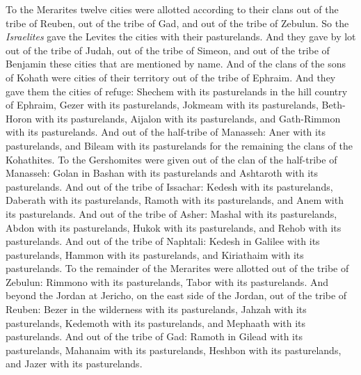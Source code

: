 \begin{biblechapter}
\verse To the Merarites twelve cities were allotted according to their clans out of the tribe of Reuben, out of the tribe of Gad, and out of the tribe of Zebulun.
\verse So the \textit{Israelites} gave the Levites the cities with their pasturelands.
\verse And they gave by lot out of the tribe of Judah, out of the tribe of Simeon, and out of the tribe of Benjamin these cities that are mentioned by name.
\verse And of the clans of the sons of Kohath were cities of their territory out of the tribe of Ephraim.
\verse And they gave them the cities of refuge: Shechem with its pasturelands in the hill country of Ephraim, Gezer with its pasturelands,
\verse Jokmeam with its pasturelands, Beth-Horon with its pasturelands,
\verse Aijalon with its pasturelands, and Gath-Rimmon with its pasturelands.
\verse And out of the half-tribe of Manasseh: Aner with its pasturelands, and Bileam with its pasturelands for the remaining the clans of the Kohathites.
\verse To the Gershomites were given out of the clan of the half-tribe of Manasseh: Golan in Bashan with its pasturelands and Ashtaroth with its pasturelands.
\verse And out of the tribe of Issachar: Kedesh with its pasturelands, Daberath with its pasturelands,
\verse Ramoth with its pasturelands, and Anem with its pasturelands.
\verse And out of the tribe of Asher: Mashal with its pasturelands, Abdon with its pasturelands,
\verse Hukok with its pasturelands, and Rehob with its pasturelands.
\verse And out of the tribe of Naphtali: Kedesh in Galilee with its pasturelands, Hammon with its pasturelands, and Kiriathaim with its pasturelands.
\verse To the remainder of the Merarites were allotted out of the tribe of Zebulun: Rimmono with its pasturelands, Tabor with its pasturelands.
\verse And beyond the Jordan at Jericho, on the east side of the Jordan, out of the tribe of Reuben: Bezer in the wilderness with its pasturelands, Jahzah with its pasturelands,
\verse Kedemoth with its pasturelands, and Mephaath with its pasturelands.
\verse And out of the tribe of Gad: Ramoth in Gilead with its pasturelands, Mahanaim with its pasturelands,
\verse Heshbon with its pasturelands, and Jazer with its pasturelands.
\end{biblechapter}

